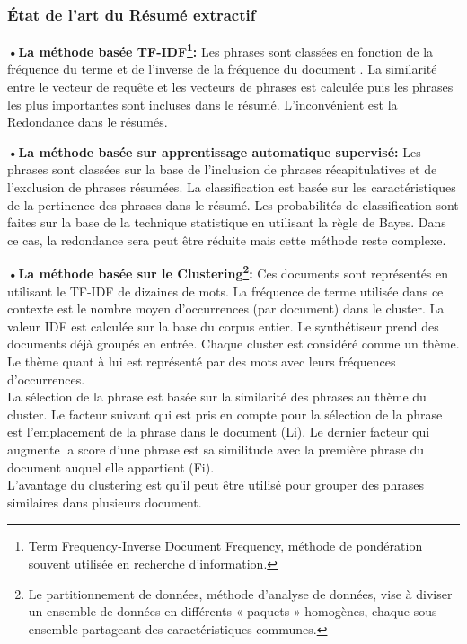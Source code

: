         \subsubsection{État de l'art du Résumé extractif}
        \textbf{•La méthode basée TF-IDF\footnote{Term Frequency-Inverse Document Frequency, méthode de pondération souvent utilisée en recherche d'information.}:}
            Les phrases sont classées en fonction de la fréquence du terme et de l'inverse de la fréquence du document \cite{tfidf}. La similarité entre le vecteur de requête et les vecteurs de phrases est calculée puis les phrases les plus importantes sont incluses dans le résumé. L'inconvénient est  la Redondance dans le résumés.\cite{surveysummarization}
            
        \textbf{•La méthode basée sur apprentissage automatique supervisé:} Les phrases sont classées sur la base de l'inclusion de phrases récapitulatives et de l'exclusion de phrases résumées. La classification est basée sur les caractéristiques de la pertinence des phrases dans le résumé. Les probabilités de classification sont faites sur la base de la technique statistique en utilisant la règle de Bayes. Dans ce cas, la redondance sera peut être réduite mais cette méthode reste complexe.\cite{surveysummarization}
            
        \textbf{•La méthode basée sur le Clustering\footnote{Le partitionnement de données, méthode d'analyse de données, vise à diviser un ensemble de données en différents « paquets » homogènes, chaque sous-ensemble partageant des caractéristiques communes.}:} Ces documents sont représentés en utilisant le TF-IDF de dizaines de mots. La fréquence de terme utilisée dans ce contexte est le nombre moyen d'occurrences (par document) dans le cluster. La valeur IDF est calculée sur la base du corpus entier. Le synthétiseur prend des documents déjà groupés en entrée. Chaque cluster est considéré comme un thème.
        Le thème quant à lui est représenté par des mots avec leurs fréquences d’occurrences.\\
        La sélection de la phrase est basée sur la similarité des phrases au thème du cluster. Le facteur suivant qui est pris en compte pour la sélection de la phrase est l'emplacement de la phrase dans le document (Li). Le dernier facteur qui augmente la score d'une phrase est sa similitude avec la première phrase du document auquel elle appartient (Fi).\\
        L'avantage du clustering est qu'il peut être utilisé pour grouper des phrases similaires dans plusieurs document\cite{surveysummarization}.
            
